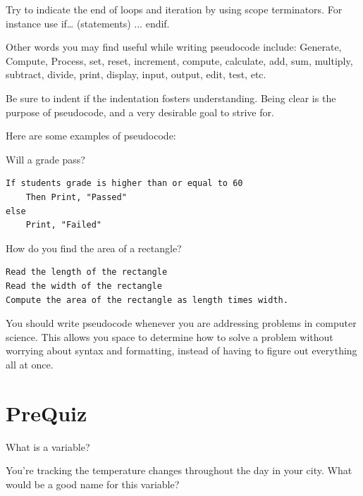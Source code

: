 Try to indicate the end of loops and iteration by using scope terminators.
For instance use if… (statements) ... endif.

Other words you may find useful while writing pseudocode include: Generate, Compute, Process, set, reset, increment, compute, calculate, add, sum, multiply, subtract, divide, print, display, input, output, edit, test, etc.

Be sure to indent if the indentation fosters understanding. Being clear is the purpose of pseudocode, and a very desirable goal to strive for.

Here are some examples of pseudocode:

\begin{example} Will a grade pass?
\begin{verbatim}
If students grade is higher than or equal to 60
	Then Print, "Passed"
else
	Print, "Failed"
\end{verbatim}
    
\end{example}

\begin{example} How do you find the area of a rectangle?
\begin{verbatim}
Read the length of the rectangle
Read the width of the rectangle
Compute the area of the rectangle as length times width.
\end{verbatim}
    
\end{example}

You should write pseudocode whenever you are addressing problems in computer science. This allows you space to determine how to solve a problem without worrying about syntax and formatting, instead of having to figure out everything all at once. 

\section{PreQuiz}
\begin{problem}
    What is a variable?
\end{problem}

\vspace{2cm}

\begin{problem}
    You're tracking the temperature changes throughout the day in your city. What would be a good name for this variable?
\end{problem}

\vspace{1.5cm}

